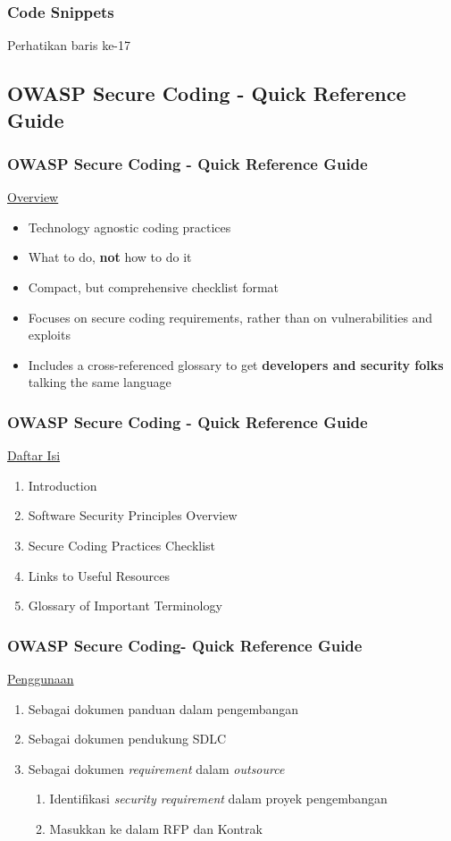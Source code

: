 \documentclass[xcolor=pdftex,table,handouts]{beamer}
\begin{document}
\begin{frame}[fragile]
	\frametitle{Code Snippets}
			
	\begin{center}
		Perhatikan baris ke-17
	\end{center}
\end{frame}

\subsection{OWASP Secure Coding - Quick Reference Guide}

\begin{frame}
	\frametitle{OWASP Secure Coding - Quick Reference Guide}
	\underline{Overview}
	\begin{itemize}
		\item Technology agnostic coding practices \pause
		\item What to do, \textbf{not} how to do it \pause
		\item Compact, but comprehensive checklist format \pause
		\item Focuses on secure coding requirements, rather than on vulnerabilities and exploits \pause
		\item Includes a cross-referenced glossary to get \textbf{developers and security folks} talking the same language
	\end{itemize}
\end{frame}

\begin{frame}
	\frametitle{OWASP Secure Coding - Quick Reference Guide}
	\underline{Daftar Isi}
	\begin{enumerate}
		\item Introduction
		\item Software Security Principles Overview
		\item Secure Coding Practices Checklist
		\item Links to Useful Resources
		\item Glossary of Important Terminology
	\end{enumerate}
\end{frame}

\begin{frame}
	\frametitle{OWASP Secure Coding- Quick Reference Guide}
	\underline{Penggunaan}
	\begin{enumerate}
		\item Sebagai dokumen panduan dalam pengembangan
		\item Sebagai dokumen pendukung SDLC
		\item Sebagai dokumen \textit{requirement} dalam \textit{outsource}
		\begin{enumerate}
			\item Identifikasi \textit{security requirement} dalam proyek pengembangan
			\item Masukkan ke dalam RFP dan Kontrak
		\end{enumerate}
	\end{enumerate}
\end{frame}
\end{document}
